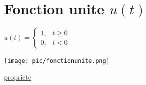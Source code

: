 \documentclass[12pt]{book}
\begin{document}
        \section{Fonction unite $u(t)$}
            \begin{center}
                \begin{minipage}{0.49\linewidth}
                    $u(t) = 
                    \begin{cases}
                        1, & t \geq 0 \\
                        0, & t < 0
                      \end{cases}
                      $
                \end{minipage}
                \begin{minipage}{0.39\linewidth}
                    \texttt{[image: pic/fonctionunite.png]}
                \end{minipage}
            \end{center}
            \underline{propriete} \\ 
\end{document}
